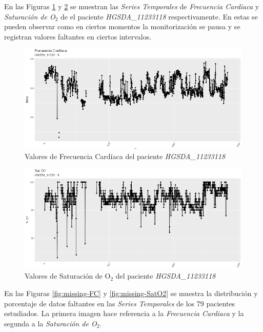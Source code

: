 En las Figuras \ref{fig:fc-HGSDA} y \ref{fig:satO2-HGSDA} se muestran las \textit{Series Temporales} de \textit{Frecuencia Cardiaca} y \textit{Saturación de O$_2$} de el paciente \textit{HGSDA\_11233118} respectivamente. En estas se pueden observar como en ciertos momentos la monitorización se pausa y se registran valores faltantes en ciertos intervalos. 
\begin{figure}[H]
    \centering
    \includegraphics[scale=0.85]{./img/Heart-Rate-HGSDA.png}
    \caption{Valores de Frecuencia Cardíaca del paciente \textit{HGSDA\_11233118}}
    \label{fig:fc-HGSDA}
\end{figure}

\begin{figure}[H]
    \centering
    \includegraphics[scale=0.85]{./img/SatO2-HGSDA.png}
    \caption{Valores de Saturación de O$_2$ del paciente \textit{HGSDA\_11233118}}
    \label{fig:satO2-HGSDA}
\end{figure}


En las Figuras \ref{fig:missing-FC} y \ref{fig:missing-SatO2} se muestra la distribución y porcentaje de datos faltantes en las \textit{Series Temporales} de los 79 pacientes estudiados. La primera imagen hace referencia a la \textit{Frecuencia Cardiaca} y la segunda a la \textit{Saturación de O$_2$}.

\newpage
\thispagestyle{empty}


